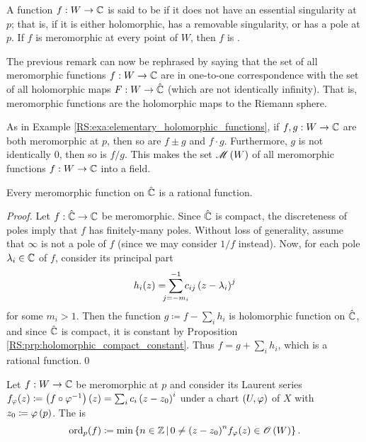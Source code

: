 \documentclass[../Moduli_Spaces_of_Riemann_Surfaces.tex]{subfiles}
\begin{document}
    \begin{definition}
        A function $f:W\to\mathbb{C}$ is said to be  if it does not have an essential singularity at $p$; that is, if it is either holomorphic, has a removable singularity, or has a pole at $p$. If $f$ is meromorphic at every point of $W$, then $f$ is .
    \end{definition}
    \begin{remark}
        The previous remark can now be rephrased by saying that the set of all meromorphic functions $f:W\to\mathbb{C}$ are in one-to-one correspondence with the set of all holomorphic maps $F:W\to\hat{\mathbb{C}}$ (which are not identically infinity). That is, meromorphic functions are the holomorphic maps to the Riemann sphere.\exqed
    \end{remark}
    \begin{example}
        As in Example \ref{RS:exa:elementary_holomorphic_functions}, if $f,g:W\to\mathbb{C}$ are both meromorphic at $p$, then so are $f\pm g$ and $f\cdot g$. Furthermore, $g$ is not identically $0$, then so is $f/g$. This makes the set $\mathscr{M}\left(W\right)$ of all meromorphic functions $f:W\to\mathbb{C}$ into a field.\exqed
    \end{example}
    \begin{proposition}\label{RS:prp:meromorphic_Riemann_sphere_rational}
        Every meromorphic function on $\hat{\mathbb{C}}$ is a rational function.
    \end{proposition}
    \begin{proof}
        Let $f:\hat{\mathbb{C}}\to\mathbb{C}$ be meromorphic. Since $\hat{\mathbb{C}}$ is compact, the discreteness of poles imply that $f$ has finitely-many poles. Without loss of generality, assume that $\infty$ is not a pole of $f$ (since we may consider $1/f$ instead). Now, for each pole $\lambda_i\in\mathbb{C}$ of $f$, consider its principal part
        \begin{equation*}
            h_i\!\l(z\r)=\sum_{\mathclap{j=-m_i}}^{-1}c_{ij}\l(z-\lambda_i\r)^j
        \end{equation*}
        for some $m_i>1$. Then the function $g\coloneqq f-\sum_ih_i$ is holomorphic function on $\hat{\mathbb{C}}$, and since $\hat{\mathbb{C}}$ is compact, it is constant by Proposition \ref{RS:prp:holomorphic_compact_constant}. Thus $f=g+\sum_ih_i$, which is a rational function.\qed
    \end{proof}
    \begin{definition}\label{RS:def:order}
        Let $f:W\to\mathbb{C}$ be meromorphic at $p$ and consider its Laurent series $f_\varphi\!\left(z\right)\coloneqq\left(f\circ\varphi^{-1}\right)\left(z\right)=\sum_{i}c_i\left(z-z_0\right)^i$ under a chart $\left(U,\varphi\right)$ of $X$ with $z_0\coloneqq\varphi\left(p\right)$. The  is
        \begin{equation*}
            \operatorname{ord}_p\!\left(f\right)\coloneqq\operatorname{min}\left\{n\in\mathbb{Z}\,\middle\vert\,0\neq\left(z-z_0\right)^n\!f_\varphi\!\left(z\right)\in\mathscr{O}\left(W\right)\right\}.
        \end{equation*}
    \end{definition}
\end{document}
